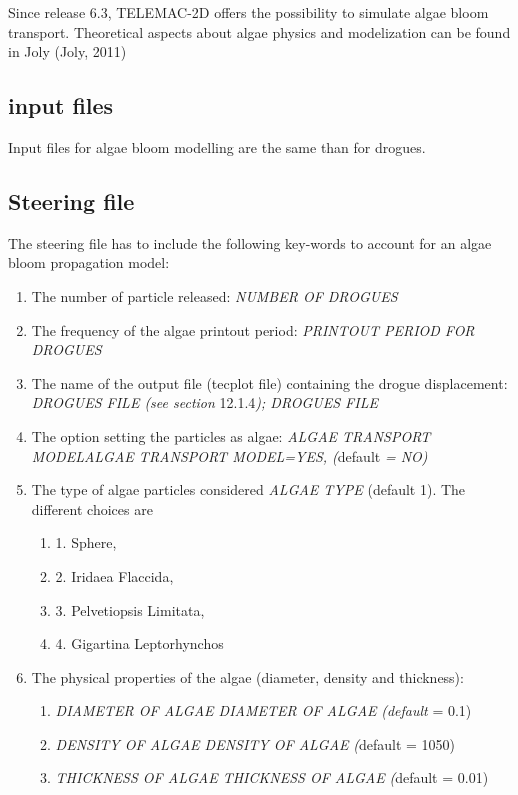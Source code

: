  Since release 6.3, TELEMAC-2D offers the possibility to simulate algae bloom transport. Theoretical aspects about algae physics and modelization can be found in Joly (Joly, 2011)


\subsection{ input files}

 Input files for algae bloom modelling are the same than for drogues.


\subsection{ Steering file}

 The steering file has to include the following key-words to account for an algae bloom propagation model:

\begin{enumerate}
\item  The number of particle released: \textit{NUMBER OF DROGUES}

\item  The frequency of the algae printout period: \textit{PRINTOUT PERIOD FOR DROGUES}

\item  The name of the output file (tecplot file) containing the drogue displacement: \textit{DROGUES FILE (see section }12.1.4\textit{); DROGUES FILE} \textit{ }

\item  The option setting the particles as algae: \textit{ALGAE TRANSPORT MODELALGAE TRANSPORT MODEL=YES, (}default\textit{ = NO)}

\item  The type of algae particles considered \textit{ALGAE TYPE} (default 1). The different choices are

\begin{enumerate}
\item  1. Sphere,

\item  2. Iridaea Flaccida,

\item  3. Pelvetiopsis Limitata,

\item  4. Gigartina Leptorhynchos
\end{enumerate}

\item  The physical properties of the algae (diameter, density and thickness):

\begin{enumerate}
\item  \textit{DIAMETER OF ALGAE  DIAMETER OF ALGAE} \textit{(default }= 0.1)

\item  \textit{DENSITY OF ALGAE  DENSITY OF ALGAE} \textit{(}default = 1050)

\item  \textit{THICKNESS OF ALGAE  THICKNESS OF ALGAE} \textit{(}default = 0.01)
\end{enumerate}
\end{enumerate}

